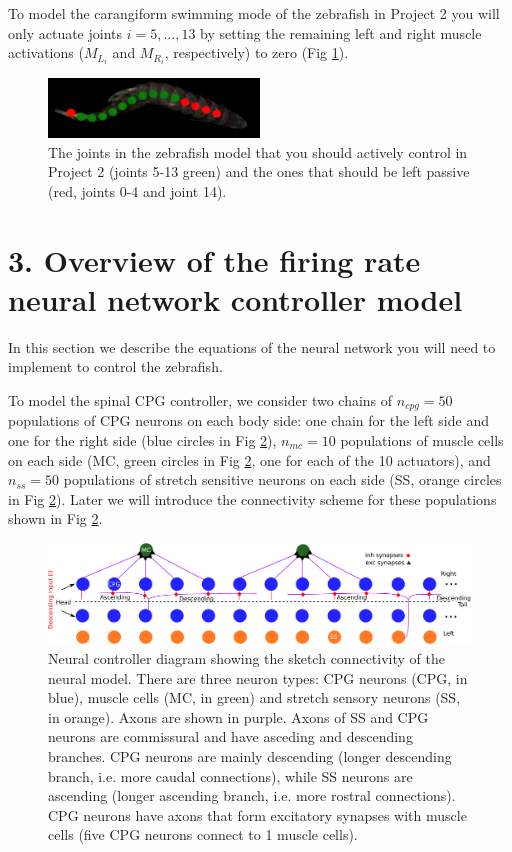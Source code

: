 \documentclass{cmc}
\begin{document}
To model the carangiform swimming mode of the zebrafish in Project 2 you will only actuate joints $i=5,...,13$ by setting the remaining left and right muscle activations ($M_{L_i}$ and $M_{R_i}$, respectively) to zero (Fig \ref{fig:model_carangiform}).

\begin{figure}[ht]
  \centering \includegraphics[width=0.5\textwidth]{figures/model_carangiform.png}
  \caption{\label{fig:model_carangiform} The joints in the zebrafish model that you should actively control in Project 2 (joints 5-13 green) and the ones that should be left passive (red, joints 0-4 and joint 14). }
\end{figure}


\section*{3. Overview of the firing rate neural network controller model}\label{sec:controller}

In this section we describe the equations of the neural network you will need to implement to control the zebrafish.

To model the spinal CPG controller, we consider two chains of $n_{cpg}=50$ populations of CPG neurons on each body side: one chain for the left side and one for the right side (blue circles in Fig \ref{fig:neural_diagram}), $n_{mc}=10$ populations of muscle cells on each side (MC, green circles in Fig \ref{fig:neural_diagram}, one for each of the 10 actuators), and $n_{ss}=50$ populations of stretch sensitive neurons on each side (SS, orange circles in Fig \ref{fig:neural_diagram}). Later we will introduce the connectivity scheme for these populations shown in Fig \ref{fig:neural_diagram}.

\begin{figure}[ht]
  \centering \includegraphics[width=1\textwidth]{figures/nn_diagram.png}
  \caption{\label{fig:neural_diagram} Neural controller diagram showing the sketch connectivity of the neural model. There are three neuron types: CPG neurons (CPG, in blue), muscle cells (MC, in green) and stretch sensory neurons (SS, in orange). Axons are shown in purple. Axons of SS and CPG neurons are commissural and have asceding and descending branches. CPG neurons are mainly descending (longer descending branch, i.e. more caudal connections), while SS neurons are ascending (longer ascending branch, i.e. more rostral connections). CPG neurons have axons that form excitatory synapses with muscle cells (five CPG neurons connect to 1 muscle cells). }
\end{figure}
\end{document}

